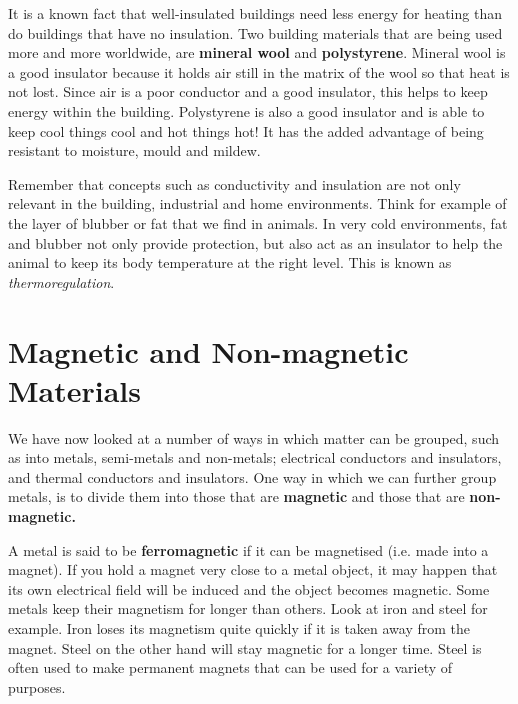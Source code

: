 \begin{IFact}{It is a known fact that well-insulated buildings need less energy for heating than do buildings that have no insulation. Two building materials that are being used more and more worldwide, are \textbf{mineral wool} and \textbf{polystyrene}. Mineral wool is a good insulator because it holds air still in the matrix of the wool so that heat is not lost. Since air is a poor conductor and a good insulator, this helps to keep energy within the building. Polystyrene is also a good insulator and is able to keep cool things cool and hot things hot! It has the added advantage of being resistant to moisture, mould and mildew.}
\end{IFact}

Remember that concepts such as conductivity and insulation are not only relevant in the building, industrial and home environments. Think for example of the layer of blubber or fat that we find in animals. In very cold environments, fat and blubber not only provide protection, but also act as an insulator to help the animal to keep its body temperature at the right level. This is known as \textit{thermoregulation}.







\section{Magnetic and Non-magnetic Materials}
\label{sec:cm:mnm}

We have now looked at a number of ways in which matter can be grouped, such as into metals, semi-metals and non-metals; electrical conductors and insulators, and thermal conductors and insulators. One way in which we can further group metals, is to divide them into those that are \textbf{magnetic} and those that are \textbf{non-magnetic.} 


A metal is said to be \textbf{ferromagnetic} if it can be magnetised (i.e. made into a magnet). If you hold a magnet very close to a metal object, it may happen that its own electrical field will be induced and the object becomes magnetic. Some metals keep their magnetism for longer than others. Look at iron and steel for example. Iron loses its magnetism quite quickly if it is taken away from the magnet. Steel on the other hand will stay magnetic for a longer time. Steel is often used to make permanent magnets that can be used for a variety of purposes. \\


